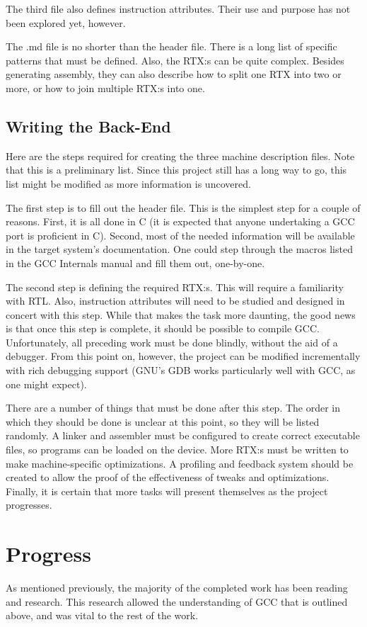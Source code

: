 \documentclass{article}
\begin{document}
The third file also defines instruction attributes. Their use and purpose has
not been explored yet, however.

The .md file is no shorter than the header file. There is a long list of
specific patterns that must be defined. Also, the RTX:s can be quite complex.
Besides generating assembly, they can also describe how to split one RTX into
two or more, or how to join multiple RTX:s into one. 

\subsection{Writing the Back-End}
Here are the steps required for creating the three machine description files.
Note that this is a preliminary list. Since this project still has a long way to
go, this list might be modified as more information is uncovered.

The first step is to fill out the header file. This is the simplest step for a
couple of reasons. First, it is all done in C (it is expected that anyone
undertaking a GCC port is proficient in C). Second, most of the needed
information will be available in the target system's documentation. One could
step through the macros listed in the GCC Internals manual and fill them out,
one-by-one. 

The second step is defining the required RTX:s. This will require a familiarity
with RTL. Also, instruction
attributes will need to be studied and designed in concert with this step. While
that makes the task more daunting, the good news is that once this step is
complete, it should be possible to compile GCC. Unfortunately, all preceding
work must be done blindly, without the aid of a debugger. From this point on,
however, the project can be modified incrementally with rich debugging support
(GNU's GDB works particularly well with GCC, as one might expect). 

There are a number of things that must be done after this step. The order in
which they should be done is unclear at this point, so they will be listed
randomly. A linker and assembler must be configured to create correct executable
files, so programs can be loaded on the device. More RTX:s must be written to
make machine-specific optimizations. A profiling and feedback system should be
created to allow the proof of the effectiveness of tweaks and optimizations.
Finally, it is certain that more tasks will present themselves as the project
progresses.

\section{Progress}
As mentioned previously, the majority of the completed work has been reading and
research. This research allowed the understanding of GCC that is outlined above,
and was vital to the rest of the work. 
\end{document}

